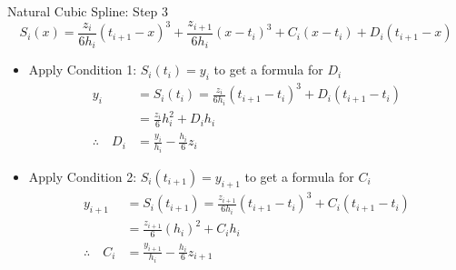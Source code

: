 \documentclass[10pt]{beamer}
\begin{document}
\begin{frame}{Natural Cubic Spline: Step 3}
         $$ S_i(x) = \frac{z_i}{6h_i}(t_{i+1}-x)^3 +\frac{z_{i+1}}{6h_i}(x-t_i)^3 + C_i(x-t_i) + D_i(t_{i+1}-x) $$

\begin{itemize}
    \item Apply Condition 1:  $S_i(t_i)=y_i$ to get a formula for $D_i$
        \begin{align*}
          y_i & = S_i(t_i) = \frac{z_i}{6h_i}(t_{i+1}-t_i)^3    + D_i(t_{i+1}-t_i)\\
              & = \frac{z_i}{6}h_i^2 + D_i h_i\\
         \therefore\quad D_i & = \frac{y_i}{h_i} - \frac{h_i}{6}z_i 
        \end{align*}
    \item Apply Condition 2: $S_i(t_{i+1})=y_{i+1}$ to get a formula for $C_i$
        \begin{align*}
          y_{i+1} & = S_i(t_{i+1}) =   \frac{z_{i+1}}{6h_i}(t_{i+1}-t_i)^3 + C_i(t_{i+1}-t_i)  \\
          & = \frac{z_{i+1}}{6}(h_i)^2 + C_ih_i\\
         \therefore\quad C_i & = \frac{y_{i+1}}{h_i} - \frac{h_i}{6}z_{i+1}
        \end{align*}
\end{itemize}
\end{frame}
\end{document}
